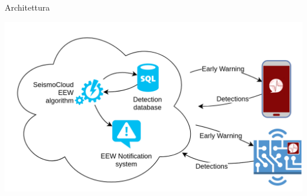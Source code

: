 \begin{frame}[c]{Architettura}
\begin{center}
\includegraphics[scale=0.3]{introduzione/SeismoCloud_arch}
\end{center}
\end{frame}

